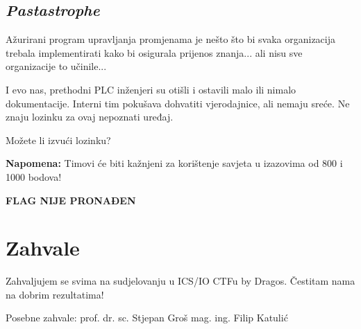 \documentclass{article}
\begin{document}
\subsection{\textit{Pastastrophe}}
\begin{tcolorbox}[
    colback=gray!5,  %
    colframe=gray!75,  %
    title=\textbf{Zadatak}]
    Ažurirani program upravljanja promjenama je nešto što bi svaka organizacija trebala implementirati kako bi osigurala prijenos znanja... ali nisu sve organizacije to učinile...

    I evo nas, prethodni PLC inženjeri su otišli i ostavili malo ili nimalo dokumentacije. Interni tim pokušava dohvatiti vjerodajnice, ali nemaju sreće. Ne znaju lozinku za ovaj nepoznati uređaj.

    Možete li izvući lozinku?

    \textbf{Napomena:} Timovi će biti kažnjeni za korištenje savjeta u izazovima od 800 i 1000 bodova!
\end{tcolorbox}

\begin{center}
    \textbf{FLAG NIJE PRONAĐEN}
\end{center}

\newpage
\section{Zahvale}
\begin{center}
    \vspace*{\fill}
    Zahvaljujem se svima na sudjelovanju u ICS/IO CTFu by Dragos. Čestitam nama na dobrim rezultatima!

    Posebne zahvale:
    prof. dr. sc. Stjepan Groš
    \newline
    mag. ing. Filip Katulić
    \vspace*{\fill}
\end{center}
\end{document}
